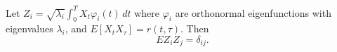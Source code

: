 Let $Z_i = \sqrt{\lambda_i} \int_0^T X_t \varphi_i(t) \, dt$ where $\varphi_i$ are orthonormal eigenfunctions with eigenvalues $\lambda_i$, and $E[X_t X_\tau] = r(t,\tau)$. Then
$$E Z_i Z_j = \delta_{ij}.$$
